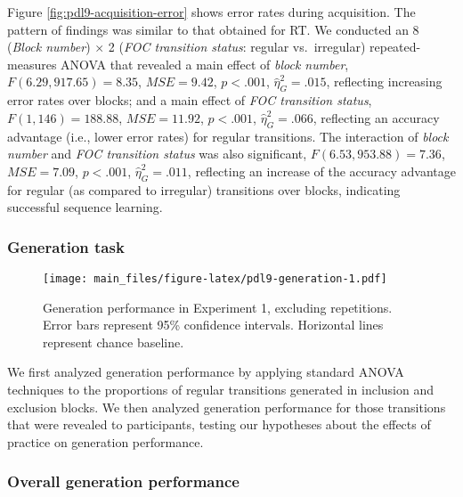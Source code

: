 \documentclass[english,,man]{apa6}
\begin{document}
Figure \ref{fig:pdl9-acquisition-error} shows error rates during acquisition.
The pattern of findings was similar to that obtained for RT.
We conducted an 8 (\emph{Block number}) \(\times\) 2 (\emph{FOC transition status}: regular vs.~irregular) repeated-measures ANOVA that revealed
a main effect of \emph{block number},
\(F(6.29, 917.65) = 8.35\), \(\mathit{MSE} = 9.42\), \(p < .001\), \(\hat{\eta}^2_G = .015\),
reflecting increasing error rates over blocks;
and a main effect of \emph{FOC transition status},
\(F(1, 146) = 188.88\), \(\mathit{MSE} = 11.92\), \(p < .001\), \(\hat{\eta}^2_G = .066\),
reflecting an accuracy advantage (i.e., lower error rates) for regular transitions.
The interaction of \emph{block number} and \emph{FOC transition status} was also significant,
\(F(6.53, 953.88) = 7.36\), \(\mathit{MSE} = 7.09\), \(p < .001\), \(\hat{\eta}^2_G = .011\),
reflecting an increase of the accuracy advantage for regular (as compared to irregular) transitions over blocks, indicating successful sequence learning.

\hypertarget{generation-task}{%
\subsubsection{Generation task}\label{generation-task}}

\begin{figure}
\centering
\texttt{[image: main\_files/figure-latex/pdl9-generation-1.pdf]}
\caption{\label{fig:pdl9-generation}Generation performance in Experiment 1, excluding repetitions. Error bars represent 95\% confidence intervals. Horizontal lines represent chance baseline.}
\end{figure}

We first analyzed generation performance by applying standard ANOVA techniques to the proportions of regular transitions generated in inclusion and exclusion blocks.
We then analyzed generation performance for those transitions that were revealed to participants, testing our hypotheses about the effects of practice on generation performance.

\hypertarget{overall-generation-performance}{%
\subsubsection{Overall generation performance}\label{overall-generation-performance}}
\end{document}
